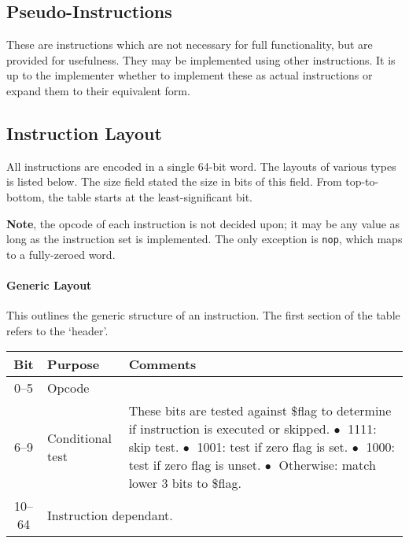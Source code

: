 \documentclass[10pt]{article}
\begin{document}
    

    \subsection{Pseudo-Instructions}\label{subsec:pseudo-instructions}

    These are instructions which are not necessary for full functionality, but are provided for usefulness.
    They may be implemented using other instructions.
    It is up to the implementer whether to implement these as actual instructions or expand them to their equivalent form.

    \subsection{Instruction Layout}\label{subsec:instruction-layout}

    All instructions are encoded in a single 64-bit word.
    The layouts of various types is listed below.
    The size field stated the size in bits of this field.
    From top-to-bottom, the table starts at the least-significant bit.

    \textbf{Note}, the opcode of each instruction is not decided upon; it may be any value as long as the instruction set is implemented.
    The only exception is \texttt{nop}, which maps to a fully-zeroed word.

    \paragraph{Generic Layout}
    This outlines the generic structure of an instruction.
    The first section of the table refers to the `header'.

    \bigskip
    \begin{tabular}{|c|l|l|}
        \hline
        \textbf{Bit} & \textbf{Purpose} & \textbf{Comments} \\
        \hline
        0--5 & Opcode & \\
        \hline
        6--9 & Conditional test & \makecell[l]{These bits are tested against \$flag to determine if instruction is executed or skipped.\\%
        \(\bullet\;\) 1111: skip test.\\%
        \(\bullet\;\) 1001: test if zero flag is set.\\%
        \(\bullet\;\) 1000: test if zero flag is unset.\\%
        \(\bullet\;\) Otherwise: match lower 3 bits to \$flag.} \\
        \hline
        \hline
        10--64 & \multicolumn{2}{l|}{Instruction dependant.} \\
        \hline
    \end{tabular}
\end{document}
